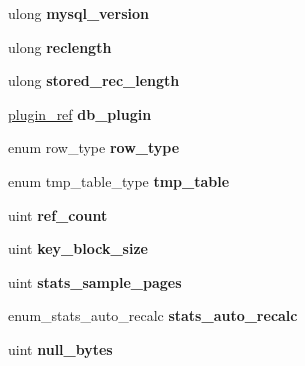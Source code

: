 \begin{DoxyCompactItemize}
\item 
\mbox{\label{structTABLE__SHARE_a366454b8e22e3ffac5ea81b2f7ac3645}} 
ulong {\bfseries mysql\+\_\+version}
\item 
\mbox{\label{structTABLE__SHARE_a52cc1e26103087d0a0053a6e00f37898}} 
ulong {\bfseries reclength}
\item 
\mbox{\label{structTABLE__SHARE_a0215455778e239d06c981c81ed7f267d}} 
ulong {\bfseries stored\+\_\+rec\+\_\+length}
\item 
\mbox{\label{structTABLE__SHARE_a5abe32cb7b03f2a5aafd131ae64bd3f4}} 
\mbox{\hyperlink{structst__plugin__int}{plugin\+\_\+ref}} {\bfseries db\+\_\+plugin}
\item 
\mbox{\label{structTABLE__SHARE_ae7fce774da971ed7499601c8632fe06a}} 
enum row\+\_\+type {\bfseries row\+\_\+type}
\item 
\mbox{\label{structTABLE__SHARE_a2a4af8d43306e0f3f43567743cc3bd46}} 
enum tmp\+\_\+table\+\_\+type {\bfseries tmp\+\_\+table}
\item 
\mbox{\label{structTABLE__SHARE_a78058d2d9158f790bc4089aed345ef75}} 
uint {\bfseries ref\+\_\+count}
\item 
\mbox{\label{structTABLE__SHARE_aee18a60e57328051e38caa228779263c}} 
uint {\bfseries key\+\_\+block\+\_\+size}
\item 
\mbox{\label{structTABLE__SHARE_a1bad47f770139b365a44fc79ba57852f}} 
uint {\bfseries stats\+\_\+sample\+\_\+pages}
\item 
\mbox{\label{structTABLE__SHARE_a22ef93ba1be0e82beef2706ddbbb6512}} 
enum\+\_\+stats\+\_\+auto\+\_\+recalc {\bfseries stats\+\_\+auto\+\_\+recalc}
\item 
\mbox{\label{structTABLE__SHARE_a82a94d999733481683853c906ad45d94}} 
uint {\bfseries null\+\_\+bytes}
\item 
\mbox{\label{structTABLE__SHARE_aaf22b6e5444378383bd7cdaad2a66d44}} 

\end{DoxyCompactItemize}
